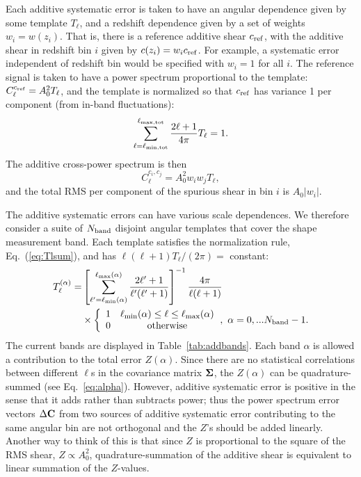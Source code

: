 \documentclass[usenatbib]{mnras}
\begin{document}
Each additive systematic error is taken to have an angular dependence
given by some template $T_\ell$, and a redshift dependence given by a
set of weights $w_i=w(z_i)$. That is, there is a reference additive
shear $c_{\rm ref}$, with the additive shear in redshift bin $i$ given
by $c(z_i) = w_ic_{\rm ref}$. For example, a systematic error
independent of redshift bin would be specified with $w_i=1$ for all
$i$. The reference signal is taken to have a power spectrum
proportional to the template: $C_\ell^{c_{\rm ref}} = A_0^2T_\ell$,
and the template is normalized so that $c_{\rm ref}$ has variance 1
per component (from in-band fluctuations):
\begin{equation}
\sum_{\ell=\ell_{\rm min,tot}}^{\ell_{\rm max,tot}} \frac{2\ell+1}{4\pi} T_\ell = 1.
\label{eq:Tlsum}
\end{equation}
The additive cross-power spectrum is then
\begin{equation}
C_\ell^{c_i,c_j} = A_0^2 w_iw_jT_\ell,
\end{equation}
and the total RMS per component of the spurious shear in bin $i$ is $A_0|w_i|$.

The additive systematic errors can have various scale dependences. We
therefore consider a suite of $N_{\rm band}$ disjoint angular
templates that cover the shape measurement band. Each template
satisfies the normalization rule, Eq.~(\ref{eq:Tlsum}), and has
$\ell(\ell+1)T_\ell/(2\pi)=$ constant:
\begin{align}
T_\ell^{(\alpha)} = &\left[ \sum_{\ell'=\ell_{\rm min}(\alpha)}^{\ell_{\rm max}(\alpha)} \frac{2\ell'+1}{\ell'(\ell'+1)} \right]^{-1} \frac{4\pi}{\ell(\ell+1)}\nonumber\\
&\times\left\{ \begin{array}{cc} 1 & \ell_{\rm min}(\alpha)\le\ell\le\ell_{\rm max}(\alpha) \\ 0 & {\rm otherwise} \end{array} \right.\!,~\alpha=0,...N_{\rm band}-1.
\end{align}
The current bands are displayed in Table~\ref{tab:addbands}. Each band
$\alpha$ is allowed a contribution to the total error
$Z(\alpha)$. Since there are no statistical correlations between
different $\ell$s in the covariance matrix ${\bf\Sigma}$, the
$Z(\alpha)$ can be quadrature-summed (see
Eq.~\ref{eq:alpha}). However, additive systematic error is positive in
the sense that it adds rather than subtracts power; thus the power
spectrum error vectors $\Delta{\bf C}$ from two sources of additive
systematic error contributing to the same angular bin are not
orthogonal and the $Z$'s should be added linearly. Another way to
think of this is that since $Z$ is proportional to the square of the
RMS shear, $Z\propto A_0^2$, quadrature-summation of the additive
shear is equivalent to linear summation of the $Z$-values.
\end{document}
